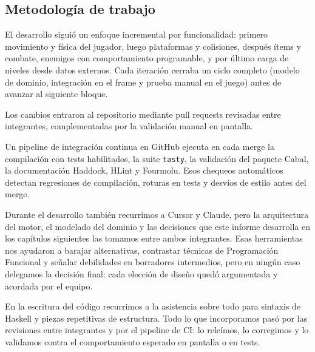 \subsection{Metodología de trabajo}
\label{subsec:intro-metodologia}

El desarrollo siguió un enfoque incremental por funcionalidad: primero movimiento y física
del jugador, luego plataformas y colisiones, después ítems y combate, enemigos con
comportamiento programable, y por último carga de niveles desde datos externos. Cada
iteración cerraba un ciclo completo (modelo de dominio, integración en el frame y
prueba manual en el juego) antes de avanzar al siguiente bloque.

Los cambios entraron al repositorio mediante pull requests revisadas entre
integrantes, complementadas por la validación manual en pantalla.

Un pipeline de integración continua en GitHub ejecuta en cada merge la compilación con
tests habilitados, la suite \texttt{tasty}, la validación del paquete Cabal, la
documentación Haddock, HLint y Fourmolu. Esos chequeos automáticos detectan regresiones de
compilación, roturas en tests y desvíos de estilo antes del merge.

Durante el desarrollo también recurrimos a Cursor y Claude, pero la arquitectura del motor,
el modelado del dominio y las decisiones que este informe desarrolla en los capítulos
siguientes las tomamos entre ambos integrantes. Esas herramientas nos ayudaron a barajar
alternativas, contrastar técnicas de Programación Funcional y señalar debilidades en
borradores intermedios, pero en ningún caso delegamos la decisión final: cada elección de
diseño quedó argumentada y acordada por el equipo.

En la escritura del código recurrimos a la asistencia sobre todo para sintaxis de Haskell
y piezas repetitivas de estructura. Todo lo que incorporamos pasó por las revisiones entre
integrantes y por el pipeline de CI: lo releímos, lo corregimos y lo validamos contra el
comportamiento esperado en pantalla o en tests.

